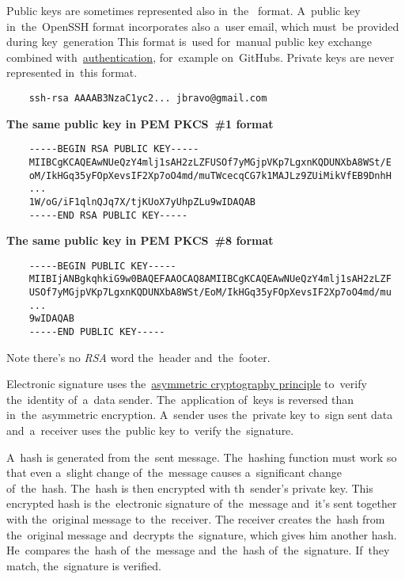 Public keys are sometimes represented also in~the~ format.
A~public key in~the~OpenSSH format incorporates also a~user email, which must~be provided during key~generation
This format is~used for~manual public key exchange combined with~\hyperref[authenticationauthorization]{authentication}, for~example on~GitHubs.
Private keys are never represented in~this format.

\begin{lstlisting}
    ssh-rsa AAAAB3NzaC1yc2... jbravo@gmail.com
\end{lstlisting}
\newline

\noindent \textbf{The same public key in PEM PKCS~\#1 format}
\begin{lstlisting}
    -----BEGIN RSA PUBLIC KEY-----
    MIIBCgKCAQEAwNUeQzY4mlj1sAH2zLZFUSOf7yMGjpVKp7LgxnKQDUNXbA8WSt/E
    oM/IkHGq35yFOpXevsIF2Xp7oO4md/muTWcecqCG7k1MAJLz9ZUiMikVfEB9DnhH
    ...
    1W/oG/iF1qlnQJq7X/tjKUoX7yUhpZLu9wIDAQAB
    -----END RSA PUBLIC KEY-----
\end{lstlisting}
\newline

\noindent \textbf{The same public key in PEM PKCS~\#8 format}
\begin{lstlisting}
    -----BEGIN PUBLIC KEY-----
    MIIBIjANBgkqhkiG9w0BAQEFAAOCAQ8AMIIBCgKCAQEAwNUeQzY4mlj1sAH2zLZF
    USOf7yMGjpVKp7LgxnKQDUNXbA8WSt/EoM/IkHGq35yFOpXevsIF2Xp7oO4md/mu
    ...
    9wIDAQAB
    -----END PUBLIC KEY-----
\end{lstlisting}
\noindent Note there's no \textit{RSA} word the~header and~the~footer.
\newpage

\label{electronicsignature}
Electronic signature uses the~\hyperref[asymmetriccryptography]{asymmetric cryptography principle} to~verify the~identity of~a~data sender.
The~application of~keys is reversed than in~the~asymmetric encryption.
A~sender uses the~private key to~sign sent data and~a~receiver uses the~public key to~verify the~signature.

A~hash is generated from the~sent message.
The~hashing function must work so that even a~slight change of~the~message causes a~significant change of~the~hash.
The~hash is then encrypted with th~sender's private key.
This encrypted hash is the~electronic signature of~the~message and~it's sent together with the~original message to~the~receiver.
The receiver creates the~hash from the~original message and~decrypts the~signature, which gives him another hash.
He~compares the~hash of~the~message and~the~hash of~the~signature.
If~they match, the~signature is verified.

